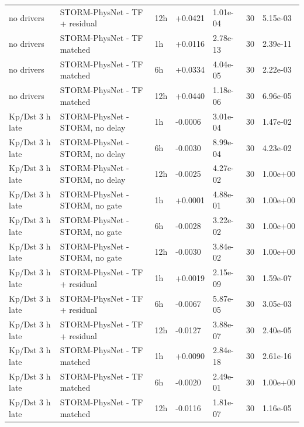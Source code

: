 \begin{tabular}{lllllrl}
no drivers & STORM-PhysNet - TF + residual & 12h & +0.0421 & 1.01e-04 & 30 & 5.15e-03 \\
no drivers & STORM-PhysNet - TF matched & 1h & +0.0116 & 2.78e-13 & 30 & 2.39e-11 \\
no drivers & STORM-PhysNet - TF matched & 6h & +0.0334 & 4.04e-05 & 30 & 2.22e-03 \\
no drivers & STORM-PhysNet - TF matched & 12h & +0.0440 & 1.18e-06 & 30 & 6.96e-05 \\
Kp/Dst 3 h late & STORM-PhysNet - STORM, no delay & 1h & -0.0006 & 3.01e-04 & 30 & 1.47e-02 \\
Kp/Dst 3 h late & STORM-PhysNet - STORM, no delay & 6h & -0.0030 & 8.99e-04 & 30 & 4.23e-02 \\
Kp/Dst 3 h late & STORM-PhysNet - STORM, no delay & 12h & -0.0025 & 4.27e-02 & 30 & 1.00e+00 \\
Kp/Dst 3 h late & STORM-PhysNet - STORM, no gate & 1h & +0.0001 & 4.88e-01 & 30 & 1.00e+00 \\
Kp/Dst 3 h late & STORM-PhysNet - STORM, no gate & 6h & -0.0028 & 3.22e-02 & 30 & 1.00e+00 \\
Kp/Dst 3 h late & STORM-PhysNet - STORM, no gate & 12h & -0.0030 & 3.84e-02 & 30 & 1.00e+00 \\
Kp/Dst 3 h late & STORM-PhysNet - TF + residual & 1h & +0.0019 & 2.15e-09 & 30 & 1.59e-07 \\
Kp/Dst 3 h late & STORM-PhysNet - TF + residual & 6h & -0.0067 & 5.87e-05 & 30 & 3.05e-03 \\
Kp/Dst 3 h late & STORM-PhysNet - TF + residual & 12h & -0.0127 & 3.88e-07 & 30 & 2.40e-05 \\
Kp/Dst 3 h late & STORM-PhysNet - TF matched & 1h & +0.0090 & 2.84e-18 & 30 & 2.61e-16 \\
Kp/Dst 3 h late & STORM-PhysNet - TF matched & 6h & -0.0020 & 2.49e-01 & 30 & 1.00e+00 \\
Kp/Dst 3 h late & STORM-PhysNet - TF matched & 12h & -0.0116 & 1.81e-07 & 30 & 1.16e-05 \\
\bottomrule
\end{tabular}
